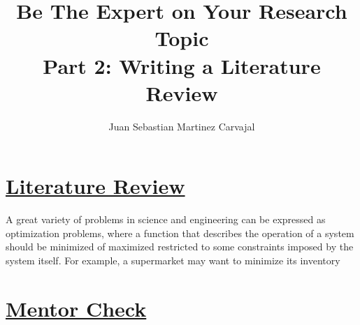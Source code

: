 \documentclass{journal}
\title{\textbf{Be The Expert on Your Research Topic}\\Part 2: Writing a Literature Review}
\author{Juan Sebastian Martinez Carvajal}
\date{}
\begin{document}
\maketitle
\hrulefill

\section{\underline{Literature Review}}

A great variety of problems in science and engineering can be expressed as optimization problems, where a function that describes the operation of a system should be minimized of maximized restricted to some constraints imposed by the system itself. For example, a supermarket may want to minimize its inventory 

\section{\underline{Mentor Check}}
\end{document}
